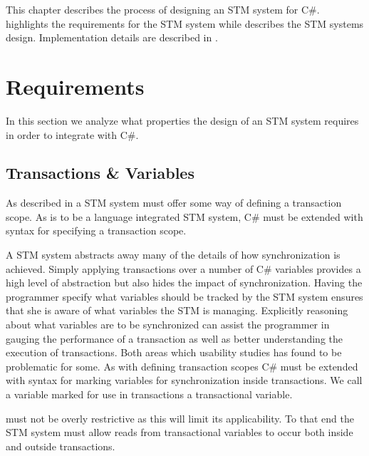 \makeatletter {}\makeatother
{}
This chapter describes the process of designing an \ac{STM} system for C\#.  highlights the requirements for the \ac{STM} system while  describes the \ac{STM} systems design. Implementation details are described in .
\label{chap:stm_design}
\section{Requirements}
\label{sec:stm_requirements}
In this section we analyze what properties the design of an \ac{STM} system requires in order to integrate with C\#.
\subsection{Transactions \& Variables}
As described in  a \ac{STM} system must offer some way of defining a transaction scope. As \stmnamesp is to be a language integrated \ac{STM} system, C\# must be extended with syntax for specifying a transaction scope.

A \ac{STM} system abstracts away many of the details of how synchronization is achieved. Simply applying transactions over a number of C\# variables provides a high level of abstraction but also hides the impact of synchronization. Having the programmer specify what variables should be tracked by the \ac{STM} system ensures that she is aware of what variables the \ac{STM} is managing. Explicitly reasoning about what variables are to be synchronized can assist the programmer in gauging the performance of a transaction as well as better understanding the execution of transactions. Both areas which usability studies\cite{rossbach2010transactional}\cite{pankratius2009does} has found to be problematic for some. As with defining transaction scopes C\# must be extended with syntax for marking variables for synchronization inside transactions. We call a variable marked for use in transactions a transactional variable.

\stmnamesp must not be overly restrictive as this will limit its applicability. To that end the \ac{STM} system must allow reads from transactional variables to occur both inside and outside transactions. 

